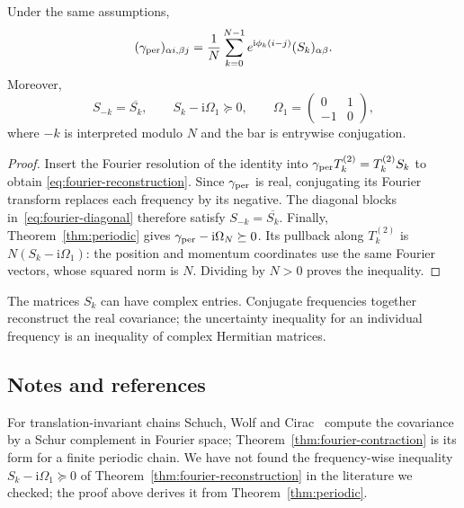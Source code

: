 \begin{theorem}\label{thm:fourier-reconstruction}
Under the same assumptions,
\begin{equation}\label{eq:fourier-reconstruction}
 (\gamma_{\rm per})_{\alpha i,\beta j}
 =\frac1N\sum_{k=0}^{N-1}e^{\mathrm i\phi_k(i-j)}(S_k)_{\alpha\beta}.
\end{equation}
Moreover,
\[
 S_{-k}=\overline{S_k},\qquad
 S_k-\mathrm i\Omega_1\succeq0,\qquad
 \Omega_1=\begin{pmatrix}0&1\\-1&0\end{pmatrix},
\]
where $-k$ is interpreted modulo $N$ and the bar is entrywise conjugation.
\end{theorem}
\begin{proof}
Insert the Fourier resolution of the identity into
$\gamma_{\rm per}T_k^{(2)}=T_k^{(2)}S_k$ to obtain
\eqref{eq:fourier-reconstruction}. Since $\gamma_{\rm per}$ is real,
conjugating its Fourier transform replaces each frequency by its negative.
The diagonal blocks in~\eqref{eq:fourier-diagonal} therefore satisfy
$S_{-k}=\overline{S_k}$. Finally, Theorem~\ref{thm:periodic} gives
$\gamma_{\rm per}-\mathrm i\Omega_N\succeq0$. Its pullback along $T_k^{(2)}$ is
$N(S_k-\mathrm i\Omega_1)$: the position and momentum coordinates use the
same Fourier vectors, whose squared norm is $N$. Dividing by $N>0$ proves
the inequality.
\end{proof}
The matrices $S_k$ can have complex entries. Conjugate frequencies together
reconstruct the real covariance; the uncertainty inequality for an individual
frequency is an inequality of complex Hermitian matrices.

\begin{vetxenv}
\subsection*{Notes and references}
For translation-invariant chains Schuch, Wolf and Cirac~\cite[Sec.~6, Eq.~(4)]{schuch} compute the covariance by a Schur
complement in Fourier space; Theorem~\ref{thm:fourier-contraction} is its form for a finite periodic chain. We have not found the
frequency-wise inequality $S_k-\mathrm i\Omega_1\succeq0$ of Theorem~\ref{thm:fourier-reconstruction} in the literature we
checked; the proof above derives it from Theorem~\ref{thm:periodic}.
\end{vetxenv}
